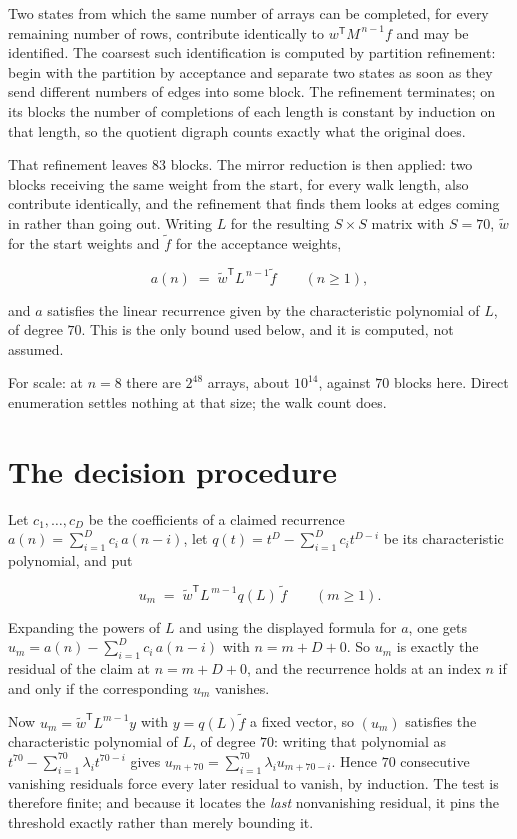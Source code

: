 \documentclass[11pt]{article}
\theoremstyle{definition}
\begin{document}
Two states from which the same number of arrays can be completed, for every remaining number of rows, contribute identically to $w^{\mathsf T}M^{\,n-1}f$ and may be identified. The coarsest such identification is computed by partition refinement: begin with the partition by acceptance and separate two states as soon as they send different numbers of edges into some block. The refinement terminates; on its blocks the number of completions of each length is constant by induction on that length, so the quotient digraph counts exactly what the original does.

That refinement leaves $83$ blocks. The mirror reduction is then applied: two blocks receiving the same weight from the start, for every walk length, also contribute identically, and the refinement that finds them looks at edges coming in rather than going out. Writing $L$ for the resulting $S \times S$ matrix with $S = 70$, $\tilde w$ for the start weights and $\tilde f$ for the acceptance weights,

\[a(n) \;=\; \tilde w^{\mathsf T} L^{\,n-1} \tilde f \qquad (n \ge 1),\]

and $a$ satisfies the linear recurrence given by the characteristic polynomial of $L$, of degree $70$. This is the only bound used below, and it is computed, not assumed.

For scale: at $n = 8$ there are $2^{48}$ arrays, about $10^{14}$, against $70$ blocks here. Direct enumeration settles nothing at that size; the walk count does.

\section{The decision procedure}

Let $c_1,\dots,c_D$ be the coefficients of a claimed recurrence $a(n) = \sum_{i=1}^{D} c_i\,a(n-i)$, let $q(t) = t^{D} - \sum_{i=1}^{D} c_i t^{D-i}$ be its characteristic polynomial, and put

\[u_m \;=\; \tilde w^{\mathsf T} L^{\,m-1} q(L)\,\tilde f \qquad (m \ge 1).\]

Expanding the powers of $L$ and using the displayed formula for $a$, one gets $u_m = a(n) - \sum_{i=1}^{D} c_i\,a(n-i)$ with $n = m + D + 0$. So $u_m$ is exactly the residual of the claim at $n = m + D + 0$, and the recurrence holds at an index $n$ if and only if the corresponding $u_m$ vanishes.

Now $u_m = \tilde w^{\mathsf T} L^{m-1} y$ with $y = q(L)\tilde f$ a fixed vector, so $(u_m)$ satisfies the characteristic polynomial of $L$, of degree $70$: writing that polynomial as $t^{70} - \sum_{i=1}^{70} \lambda_i t^{70-i}$ gives $u_{m+70} = \sum_{i=1}^{70} \lambda_i u_{m+70-i}$. Hence $70$ consecutive vanishing residuals force every later residual to vanish, by induction. The test is therefore finite; and because it locates the {\itshape last} nonvanishing residual, it pins the threshold exactly rather than merely bounding it.
\end{document}
